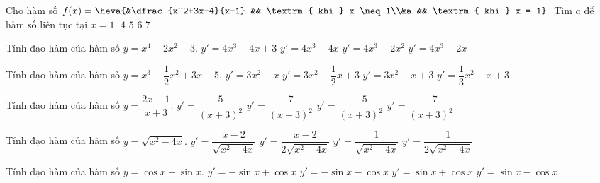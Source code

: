 \begin{ex}%
	Cho hàm số $f(x) = \heva{&\dfrac{x^2+3x-4}{x-1} && \textrm{ khi } x \neq 1\\&a  && \textrm{ khi } x = 1}.$ Tìm $a$ để hàm số liên tục tại $x=1.$
	\choice
	{$4$}
	{\True $5$}
	{$6$}
	{$7$}
\end{ex}

\begin{ex}%
	Tính đạo hàm của hàm số $y=x^4-2x^2+3.$
	\choice
	{$y'=4x^3-4x+3$}
	{\True $y'=4x^3-4x$}
	{$y'=4x^3-2x^2$}
	{$y'=4x^3-2x$}
\end{ex}

\begin{ex}%
	Tính đạo hàm của hàm số $y=x^3-\dfrac{1}{2}x^2+3x-5.$
	\choice
	{$y'=3x^2-x$}
	{$y'=3x^2-\dfrac{1}{2}x+3$}
	{\True $y'=3x^2-x+3$}
	{$y'=\dfrac{1}{3}x^2-x+3$}
\end{ex}

\begin{ex}%
	Tính đạo hàm của hàm số $y=\dfrac{2x-1}{x+3}.$
	\choice
	{$y'=\dfrac{5}{(x+3)^2}$}
	{\True $y'=\dfrac{7}{(x+3)^2}$}
	{$y'=\dfrac{-5}{(x+3)^2}$}
	{$y'=\dfrac{-7}{(x+3)^2}$}
\end{ex}

\begin{ex}%
	Tính đạo hàm của hàm số $y=\sqrt{x^2-4x}.$
	\choice
	{\True $y'=\dfrac{x-2}{\sqrt{x^2-4x}}$}
	{$y'=\dfrac{x-2}{2\sqrt{x^2-4x}}$}
	{$y'=\dfrac{1}{\sqrt{x^2-4x}}$}
	{$y'=\dfrac{1}{2\sqrt{x^2-4x}}$}
\end{ex}

\begin{ex}%
	Tính đạo hàm của hàm số $y=\cos x -\sin x.$
	\choice
	{$y'=-\sin x +\cos x$}
	{\True $y'=-\sin x -\cos x$}
	{$y'=\sin x +\cos x$}
	{$y'=\sin x -\cos x$}
\end{ex}

